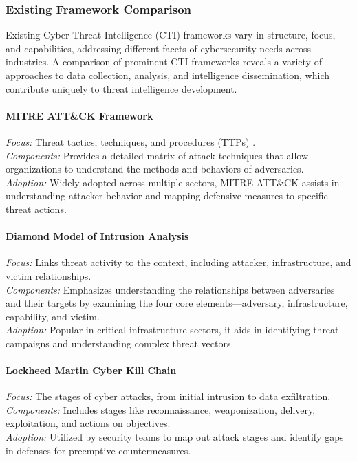 \documentclass[a4paper,twoside,12pt]{report}
\begin{document}
\subsubsection{Existing Framework Comparison}
Existing Cyber Threat Intelligence (CTI) frameworks vary in structure, focus, and capabilities, addressing different facets of cybersecurity needs across industries. A comparison of prominent CTI frameworks reveals a variety of approaches to data collection, analysis, and intelligence dissemination, which contribute uniquely to threat intelligence development.

\paragraph{MITRE ATT\&CK Framework \citet{georgiadou2021assessing}}
\textit{Focus:} Threat tactics, techniques, and procedures (TTPs) \citet{shahi2018tactics}. \\
\textit{Components:} Provides a detailed matrix of attack techniques that allow organizations to understand the methods and behaviors of adversaries. \\
\textit{Adoption:} Widely adopted across multiple sectors, MITRE ATT\&CK assists in understanding attacker behavior and mapping defensive measures to specific threat actions.

\paragraph{Diamond Model of Intrusion Analysis \citet{caltagirone2013diamond}}
\textit{Focus:} Links threat activity to the context, including attacker, infrastructure, and victim relationships. \\
\textit{Components:} Emphasizes understanding the relationships between adversaries and their targets by examining the four core elements—adversary, infrastructure, capability, and victim. \\
\textit{Adoption:} Popular in critical infrastructure sectors, it aids in identifying threat campaigns and understanding complex threat vectors.

\paragraph{Lockheed Martin Cyber Kill Chain \citet{naik2022comparing}}
\textit{Focus:} The stages of cyber attacks, from initial intrusion to data exfiltration. \\
\textit{Components:} Includes stages like reconnaissance, weaponization, delivery, exploitation, and actions on objectives. \\
\textit{Adoption:} Utilized by security teams to map out attack stages and identify gaps in defenses for preemptive countermeasures.
\end{document}
